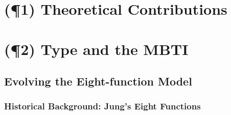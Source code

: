 


\section{(\P1) Theoretical Contributions}








\section{(\P2) Type and the MBTI}

\subsection{Evolving the Eight-function Model}

\subsubsection{Historical Background: Jung's Eight Functions}

